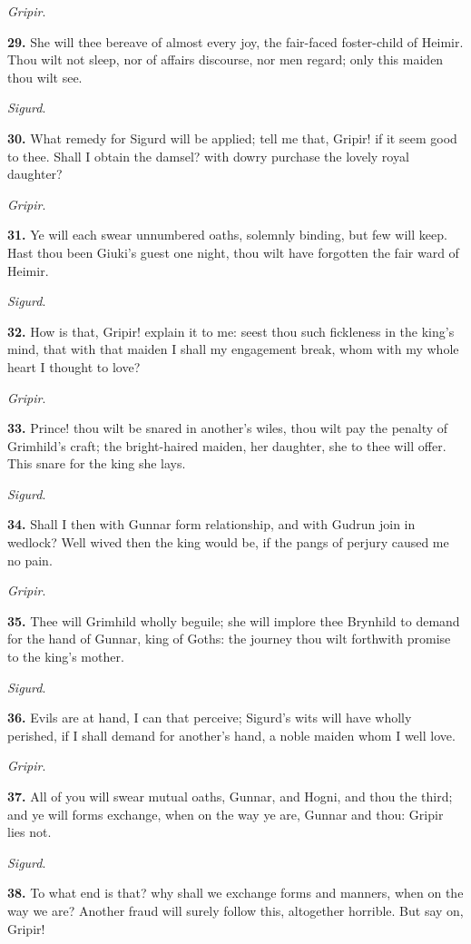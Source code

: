 \emph{Gripir}.

\textbf{29.} She will thee bereave of almost every joy, the fair-faced
foster-child of Heimir. Thou wilt not sleep, nor of affairs
discourse, nor men regard; only this maiden thou wilt see.

\emph{Sigurd}.

\textbf{30.} What remedy for Sigurd will be applied; tell me that, Gripir! if
it seem good to thee. Shall I obtain the damsel? with dowry purchase
the lovely royal daughter?

\emph{Gripir}.

\textbf{31.} Ye will each swear unnumbered oaths, solemnly binding, but few
will keep. Hast thou been Giuki's guest one night, thou wilt have
forgotten the fair ward of Heimir.

\emph{Sigurd}.

\textbf{32.} How is that, Gripir! explain it to me: seest thou such
fickleness in the king's mind, that with that maiden I shall my
engagement break, whom with my whole heart I thought to love?

\emph{Gripir}.

\textbf{33.} Prince! thou wilt be snared in another's wiles, thou wilt pay
the penalty of Grimhild's craft; the bright-haired maiden, her
daughter, she to thee will offer. This snare for the king she lays.

\emph{Sigurd}.

\textbf{34.} Shall I then with Gunnar form relationship, and with Gudrun join
in wedlock? Well wived then the king would be, if the pangs of perjury
caused me no pain.

\emph{Gripir}.

\textbf{35.} Thee will Grimhild wholly beguile; she will implore thee
Brynhild to demand for the hand of Gunnar, king of Goths: the journey
thou wilt forthwith promise to the king's mother.

\emph{Sigurd}.

\textbf{36.} Evils are at hand, I can that perceive; Sigurd's wits will have
wholly perished, if I shall demand for another's hand, a noble maiden
whom I well love.

\emph{Gripir}.

\textbf{37.} All of you will swear mutual oaths, Gunnar, and Hogni, and thou
the third; and ye will forms exchange, when on the way ye are, Gunnar
and thou: Gripir lies not.

\emph{Sigurd}.

\textbf{38.} To what end is that? why shall we exchange forms and manners,
when on the way we are? Another fraud will surely follow this,
altogether horrible. But say on, Gripir!

